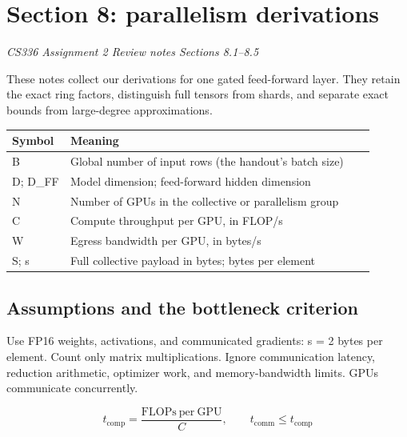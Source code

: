 \documentclass[10pt,a4paper]{article}
\begin{document}
\section*{Section 8: parallelism derivations}

\textit{CS336 Assignment 2 \textperiodcentered{} Review notes \textperiodcentered{} Sections 8.1--8.5}\par

These notes collect our derivations for one gated feed-forward layer. They retain the exact ring factors, distinguish full tensors from shards, and separate exact bounds from large-degree approximations.\par

\begin{center}\begin{tabular}{p{0.14\linewidth}p{0.76\linewidth}}\toprule

Symbol & Meaning\\\midrule

B & Global number of input rows (the handout's batch size)\\

D; D\_FF & Model dimension; feed-forward hidden dimension\\

N & Number of GPUs in the collective or parallelism group\\

C & Compute throughput per GPU, in FLOP/s\\

W & Egress bandwidth per GPU, in bytes/s\\

S; s & Full collective payload in bytes; bytes per element\\

\bottomrule\end{tabular}\end{center}

\subsection*{Assumptions and the bottleneck criterion}

Use FP16 weights, activations, and communicated gradients: s = 2 bytes per element. Count only matrix multiplications. Ignore communication latency, reduction arithmetic, optimizer work, and memory-bandwidth limits. GPUs communicate concurrently.\par

\[\boxed{t_{\mathrm{comp}}=\frac{\mathrm{FLOPs\ per\ GPU}}{C},\qquad t_{\mathrm{comm}}\leq t_{\mathrm{comp}}}\]
\end{document}
